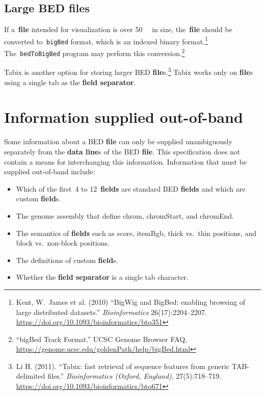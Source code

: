 \documentclass[11pt]{article}
\providecommand*{\Ac}[1]{\ac{#1}} %
\begin{document}
\subsection{Large \acs{BED} files}
If a~\textbf{file} intended for visualization is over \SI{50}{\mebi\byte} in size, the~\textbf{file} should be converted to~\texttt{bigBed} format, which is an indexed binary format.\footnote{Kent, W.~James et al.
  (2010) ``BigWig and BigBed: enabling browsing of large distributed datasets.''
  \emph{Bioinformatics} 26(17):2204--2207.
  \url{https://doi.org/10.1093/bioinformatics/btq351}}
The~\texttt{bedToBigBed} program may perform this conversion.\footnote{``bigBed Track Format.''
  \Ac{UCSC} Genome Browser FAQ, \url{https://genome.ucsc.edu/goldenPath/help/bigBed.html}}

Tabix is another option for storing larger \ac{BED} \textbf{file}s.\footnote{Li H. (2011). ``Tabix: fast retrieval of sequence features from generic TAB-delimited files.'' \emph{Bioinformatics (Oxford, England)}, 27(5):718–719. \url{https://doi.org/10.1093/bioinformatics/btq671}}
Tabix works only on \textbf{file}s using a single tab as the \textbf{field separator}.

\section{Information supplied out-of-band}

Some information about a \ac{BED} \textbf{file} can only be supplied unambiguously separately from the \textbf{data line}s of the \ac{BED} \textbf{file}.
This specification does not contain a means for interchanging this information.
Information that must be supplied out-of-band include:

\begin{itemize}
    \item Which of the first~4 to 12~\textbf{fields} are standard \ac{BED} \textbf{fields} and which are custom \textbf{field}s.
    \item The genome assembly that define \textsf{chrom}, \textsf{chromStart}, and \textsf{chromEnd}.
    \item The semantics of \textbf{fields} such as \textsf{score}, \textsf{itemRgb}, thick vs.~thin positions, and block vs.~non-block positions.
    \item The definitions of custom \textbf{field}s.
    \item Whether the \textbf{field separator} is a single tab character.
\end{itemize}
\end{document}
